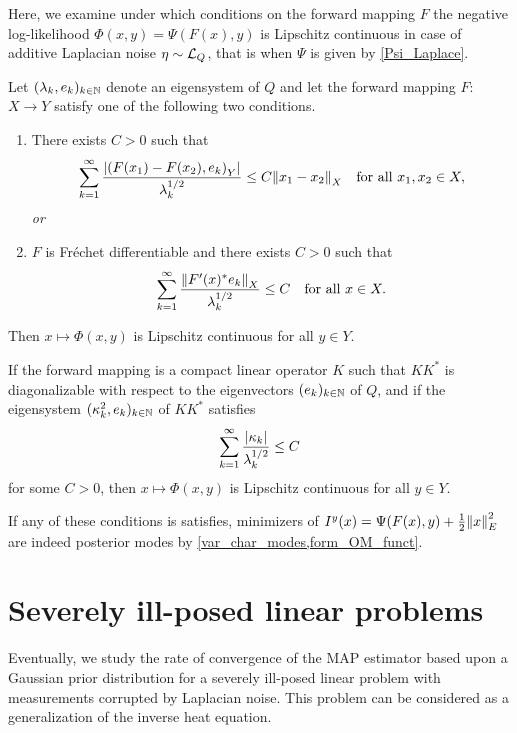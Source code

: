 \documentclass[english]{jnsao}
\theoremstyle{definition}
\begin{document}
Here, we examine under which conditions on the forward mapping $F$ the negative log-likelihood $\Phi(x,y) = \Psi(F(x),y)$ is Lipschitz continuous in case of additive Laplacian noise $\eta \sim \mathcal{L}_Q$, that is when $\Psi$ is given by \eqref{Psi_Laplace}.

\begin{proposition}
	\label{cond_nonlin_op}
	Let $(\lambda_k, e_k)_{k\in\mathbb{N}}$ denote an eigensystem of $Q$ and let the forward mapping $F$: $X \to Y$ satisfy one of the following two conditions.
	\begin{enumerate}
		\item There exists $C > 0$ such that
		\[ \sum_{k=1}^\infty \frac{{\lvert{(F(x_1) - F(x_2), e_k)}_Y\rvert}}{\lambda_k^{1/2}} \le C {\lVert x_1 - x_2\rVert}_X \quad \text{for all}~x_1,x_2 \in X, \]
		\emph{or}
		\item $F$ is Fréchet differentiable and there exists $C > 0$ such that
		\begin{equation}
			\label{cond_F}
			\sum_{k=1}^\infty \frac{{\lVert F'(x)^*e_k\rVert}_X}{\lambda_k^{1/2}} \le C \quad \text{for all}~x \in X.
		\end{equation}
	\end{enumerate}
	Then $x \mapsto \Phi(x,y)$ is Lipschitz continuous for all $y \in Y$.
\end{proposition}

\begin{proposition}
	\label{cond_lin_op}
	If the forward mapping is a compact linear operator $K$ such that $KK^*$ is diagonalizable with respect to the eigenvectors $(e_k)_{k\in\mathbb{N}}$ of $Q$, and if the eigensystem $(\kappa_k^2,e_k)_{k\in\mathbb{N}}$ of $KK^*$ satisfies
	\[ \sum_{k=1}^\infty \frac{{\lvert\kappa_k\rvert}}{\lambda_k^{1/2}} \le C \]
	for some $C > 0$, then $x \mapsto \Phi(x,y)$ is Lipschitz continuous for all $y \in Y$.
\end{proposition}

If any of these conditions is satisfies, minimizers of $I^y(x) = \Psi(F(x),y) + \frac12{\lVert x\rVert}_E^2$ are indeed posterior modes by \cref{var_char_modes,form_OM_funct}.


\section{Severely ill-posed linear problems}
\label{sect_lin_prob}

Eventually, we study the rate of convergence of the MAP estimator based upon a Gaussian prior distribution for a severely ill-posed linear problem with measurements corrupted by Laplacian noise.
This problem can be considered as a generalization of the inverse heat equation.
\end{document}
